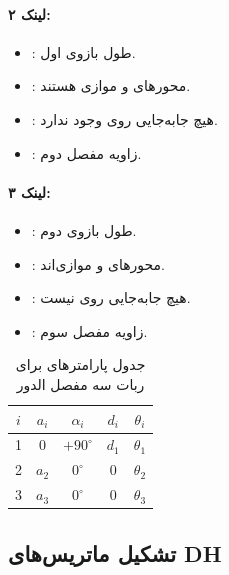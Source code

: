 \documentclass{article}
\begin{document}
\paragraph*{لینک ۲:}
\begin{itemize}
	\item {}: طول بازوی اول.
	\item {}: محورهای  و  موازی هستند.
	\item {}: هیچ جابه‌جایی روی  وجود ندارد.
	\item {}: زاویه مفصل دوم.
\end{itemize}

\paragraph*{لینک ۳:}
\begin{itemize}
	\item {}: طول بازوی دوم.
	\item {}: محورهای  و  موازی‌اند.
	\item {}: هیچ جابه‌جایی روی  نیست.
	\item {}: زاویه مفصل سوم.
\end{itemize}


\begin{table}[h]
	\centering
	\begin{tabular}{c|c|c|c|c}
		$i$ & $a_i$ & $\alpha_i$ & $d_i$ & $\theta_i$ \\
		\hline
		1 & 0     & $+90^\circ$ & $d_1$ & $\theta_1$ \\
		2 & $a_2$ & $0^\circ$   & 0     & $\theta_2$ \\
		3 & $a_3$ & $0^\circ$   & 0     & $\theta_3$ \\
	\end{tabular}
	\caption{جدول پارامترهای  برای ربات سه مفصل الدور}
\end{table}


\subsection{تشکیل ماتریس‌های DH}
\end{document}
